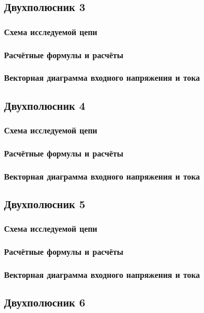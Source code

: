 \subsection{Двухполюсник 3}
\subsubsection{Схема исследуемой цепи}
\subsubsection{Расчётные формулы и расчёты}
\subsubsection{Векторная диаграмма входного напряжения и тока}

\subsection{Двухполюсник 4}
\subsubsection{Схема исследуемой цепи}
\subsubsection{Расчётные формулы и расчёты}
\subsubsection{Векторная диаграмма входного напряжения и тока}

\subsection{Двухполюсник 5}
\subsubsection{Схема исследуемой цепи}
\subsubsection{Расчётные формулы и расчёты}
\subsubsection{Векторная диаграмма входного напряжения и тока}

\subsection{Двухполюсник 6}
